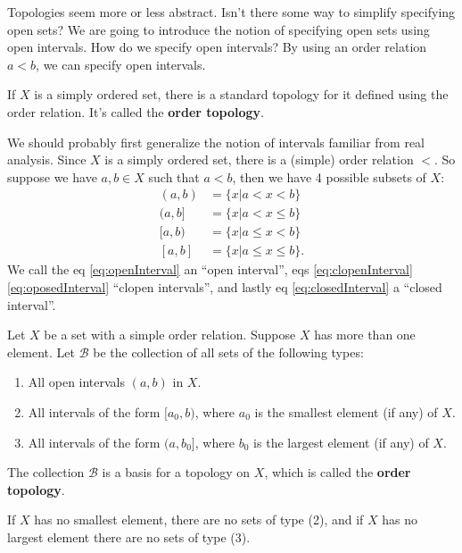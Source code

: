 \begin{prob}
Topologies seem more or less abstract. Isn't there some way to
simplify specifying open sets? We are going to introduce the
notion of specifying open sets using open intervals. How do we
specify open intervals? By using an order relation $a < b$, we
can specify open intervals.
\end{prob}

If $X$ is a simply ordered set, there is a standard topology for
it defined using the order relation. It's called the
\textbf{order topology}.

We should probably first generalize the notion of intervals
familiar from real analysis. Since $X$ is a simply ordered set,
there is a (simple) order relation $<$. So suppose we have
$a,b\in X$ such that $a<b$, then we have 4 possible subsets of
$X$:
\begin{subequations}
\begin{align}
(a,b) &= \{x|a<x<b\}\label{eq:openInterval}\\
(a,b] &= \{x|a<x\leq b\}\label{eq:clopenInterval}\\
[a,b) &= \{x|a\leq x<b\}\label{eq:oposedInterval}\\
[a,b] &= \{x|a\leq x\leq b\}\label{eq:closedInterval}.
\end{align}
\end{subequations}
We call the eq \eqref{eq:openInterval} an ``open interval'', eqs
\eqref{eq:clopenInterval} \eqref{eq:oposedInterval} ``clopen
intervals'', and lastly eq \eqref{eq:closedInterval} a ``closed
interval''.

\begin{defn}\label{defn:orderTopology}
Let $X$ be a set with a simple order relation. Suppose $X$ has
more than one element. Let $\mathscr{B}$ be the collection of all
sets of the following types:
\begin{enumerate}
\item All open intervals $(a,b)$ in $X$.
\item All intervals of the form $[a_{0},b)$, where $a_0$ is the
  smallest element (if any) of $X$.
\item All intervals of the form $(a,b_{0}]$, where $b_{0}$ is the
  largest element (if any) of $X$.
\end{enumerate}
The collection $\mathscr{B}$ is a basis for a topology on $X$,
which is called the \textbf{order topology}.
\end{defn}
\begin{rmk}\label{rmk:onOrderTopology}
If $X$ has no smallest element, there are no sets of type (2),
and if $X$ has no largest element there are no sets of type (3).
\end{rmk}

